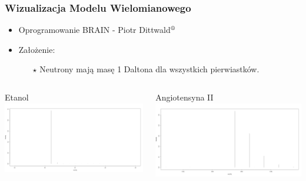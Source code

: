 \documentclass[xetex]{beamer}
\begin{document}
	\begin{frame}\frametitle{Wizualizacja Modelu Wielomianowego}

		\begin{itemize}
			\item Oprogramowanie BRAIN - Piotr Dittwald$^\text{\textregistered}$
			\item Założenie: 
			\begin{itemize}
				\item[$\star$] Neutrony mają masę 1 Daltona dla wszystkich pierwiastków.
			\end{itemize}
		\end{itemize}

		\begin{columns}
			\begin{column}[t]{.5\textwidth}
				\begin{center}
					Etanol 
					\includegraphics[height=.3\textheight, keepaspectratio]{./picts/ethanol.png}
				\end{center}
			\end{column}
			\begin{column}[t]{.5\textwidth}
				\begin{center}
					Angiotensyna II
					\includegraphics[height=.3\textheight, keepaspectratio]{./picts/angiotensine.png}		
				\end{center}
			\end{column}
		\end{columns}	


\end{frame}
\end{document}
